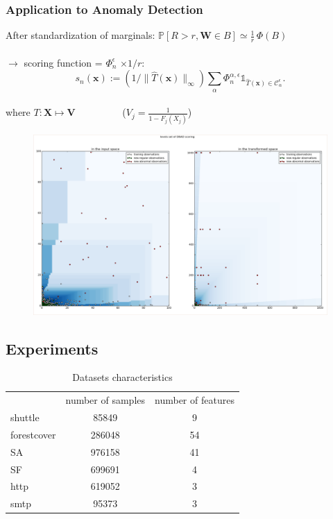 \documentclass[10pt]{beamer}
\def\mb{\mathbf}
\begin{document}
\begin{frame}
\frametitle{Application to Anomaly Detection}

After standardization of marginals: 
$\mathbb{P}[R> r  ,\mb W \in B ]  \simeq \frac{1}{r}\,\Phi(B)$ \\~\\
 $\rightarrow$ scoring function = $\Phi_n^\epsilon$  $\times 1/r:$
$$s_n(\mb x):= (1/\|\hat T(\mb x)\|_\infty) \sum_{\alpha }\Phi_n^{\alpha, \epsilon} \mathds{1}_{\hat T(\mb x) \in \mathcal{C}_\alpha^\epsilon}.$$~\\
 where $T: \mb X \mapsto \mb V$ ~~~~~~~~~($V_{j} = \frac{1}{1- F_j (X_{j})} $)

  \begin{figure}
    \centering
    \includegraphics[scale=0.15, trim=2cm 0cm 2cm 1cm]{sourcefigs/DBAD}
  \end{figure}

\end{frame}


\subsection{Experiments}


\begin{frame}
\begin{table}[h]
\centering
\begin{tabular}{|l|cc|}
  \hline
  ~           & number of samples  & number of features \\
  shuttle     & 85849              & 9                  \\
  forestcover & 286048             & 54                 \\
  SA          & 976158             & 41                 \\
  SF          & 699691             & 4                  \\
  http        & 619052             & 3                  \\
  smtp        & 95373              & 3                  \\
  \hline
\end{tabular}
\caption{Datasets characteristics}
\label{table:data}
\end{table}
\end{frame}
\end{document}
